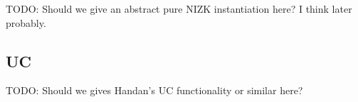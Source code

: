 TODO:  Should we give an abstract pure NIZK instantiation here?  I think later probably.


\subsection{UC}

TODO: Should we gives Handan's UC functionality or similar here? 




\endinput





















\begin{definition}
We say \rVRF satisfies {\em ring unforgeability} if
any PPT adversary $\adv$ has an advantage only
 negligible in $\lambda$ to win the game:
\begin{itemize}
\item[]
 Assume a set $\ctx_0 = \{ \pk_1,\ldots,\pk_n \}$ of public keys from
 distinct key pairs $(\pk_i,\sk_i) \leftarrow \KeyGen$ for $i=1,\ldots,n$ with $n \ge 2$.
 $\adv$ has signing oracles
 $\ora{Sign} : (i,\ctx',\msg',\aux') \mapsto
  \rSign(\sk_i,\CommitKey(\pk_i,\ctx').1,\msg',\aux')$
 for each secret key $\sk_i$ with $i=1,\ldots,n$, and
  their choice of $\ctx',\msg',\aux'$ with $\pk_i \in \ctx'$.
 Now $\adv$ wins by outputting a valid signature $\sigma$ for
 a ring $\ctx \subset \ctx_0$, a message \msg, and associated data \aux
 such that
 $\adv$ never invoked $\ora{Sign}$ on $\msg,\aux$ and $i$ with $\pk_i \in \ctx$.
\end{itemize}
\end{definition}

We also need a uniqueness condition that limits even adversaries who know the secret key.


